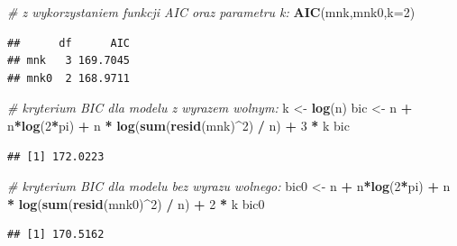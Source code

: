 \documentclass[polish,]{book}
\newenvironment{Shaded}{\begin{snugshade}}{\end{snugshade}}
\newcommand{\CommentTok}[1]{\textcolor[rgb]{0.56,0.35,0.01}{\textit{#1}}}
\newcommand{\DataTypeTok}[1]{\textcolor[rgb]{0.13,0.29,0.53}{#1}}
\newcommand{\DecValTok}[1]{\textcolor[rgb]{0.00,0.00,0.81}{#1}}
\newcommand{\KeywordTok}[1]{\textcolor[rgb]{0.13,0.29,0.53}{\textbf{#1}}}
\newcommand{\NormalTok}[1]{#1}
\newcommand{\OperatorTok}[1]{\textcolor[rgb]{0.81,0.36,0.00}{\textbf{#1}}}
\newcommand{\StringTok}[1]{\textcolor[rgb]{0.31,0.60,0.02}{#1}}
\begin{document}
\begin{Shaded}
\begin{Highlighting}[]
\CommentTok{# z wykorzystaniem funkcji AIC oraz parametru k:}
\KeywordTok{AIC}\NormalTok{(mnk,mnk0,}\DataTypeTok{k=}\DecValTok{2}\NormalTok{)}
\end{Highlighting}
\end{Shaded}

\begin{verbatim}
##      df      AIC
## mnk   3 169.7045
## mnk0  2 168.9711
\end{verbatim}

\begin{Shaded}
\begin{Highlighting}[]
\CommentTok{# kryterium BIC dla modelu z wyrazem wolnym:}
\NormalTok{k <-}\StringTok{ }\KeywordTok{log}\NormalTok{(n)}
\NormalTok{bic <-}\StringTok{ }\NormalTok{n }\OperatorTok{+}\StringTok{ }\NormalTok{n}\OperatorTok{*}\KeywordTok{log}\NormalTok{(}\DecValTok{2}\OperatorTok{*}\NormalTok{pi) }\OperatorTok{+}\StringTok{ }\NormalTok{n }\OperatorTok{*}\StringTok{ }\KeywordTok{log}\NormalTok{(}\KeywordTok{sum}\NormalTok{(}\KeywordTok{resid}\NormalTok{(mnk)}\OperatorTok{^}\DecValTok{2}\NormalTok{) }\OperatorTok{/}\StringTok{ }\NormalTok{n) }\OperatorTok{+}\StringTok{ }\DecValTok{3} \OperatorTok{*}\StringTok{ }\NormalTok{k}
\NormalTok{bic}
\end{Highlighting}
\end{Shaded}

\begin{verbatim}
## [1] 172.0223
\end{verbatim}

\begin{Shaded}
\begin{Highlighting}[]
\CommentTok{# kryterium BIC dla modelu bez wyrazu wolnego:}
\NormalTok{bic0 <-}\StringTok{ }\NormalTok{n }\OperatorTok{+}\StringTok{ }\NormalTok{n}\OperatorTok{*}\KeywordTok{log}\NormalTok{(}\DecValTok{2}\OperatorTok{*}\NormalTok{pi) }\OperatorTok{+}\StringTok{ }\NormalTok{n }\OperatorTok{*}\StringTok{ }\KeywordTok{log}\NormalTok{(}\KeywordTok{sum}\NormalTok{(}\KeywordTok{resid}\NormalTok{(mnk0)}\OperatorTok{^}\DecValTok{2}\NormalTok{) }\OperatorTok{/}\StringTok{ }\NormalTok{n) }\OperatorTok{+}\StringTok{ }\DecValTok{2} \OperatorTok{*}\StringTok{ }\NormalTok{k}
\NormalTok{bic0}
\end{Highlighting}
\end{Shaded}

\begin{verbatim}
## [1] 170.5162
\end{verbatim}
\end{document}
